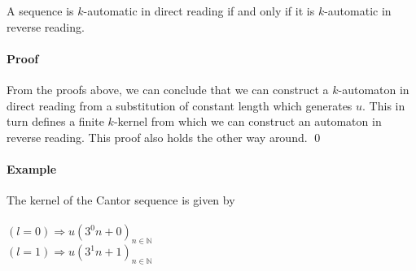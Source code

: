 \documentclass{article}
\begin{document}
\begin{automata}
A sequence is $k$-automatic in direct reading if and only if it is 
$k$-automatic in reverse reading.
\end{automata}

\paragraph{Proof} From the proofs above, we can conclude that we can construct 
a $k$-automaton in direct reading from a substitution of constant length which 
generates $u$.  This in turn defines a finite $k$-kernel from which we can 
construct an automaton in reverse reading. This proof also holds the other way 
around. \qed

\paragraph{Example} The kernel of the Cantor sequence is given by\\
\\
$(l = 0) \Rightarrow u(3^0 n + 0)_{n \in \mathbb{N}}$\\
$(l = 1) \Rightarrow u(3^1 n + 1)_{n \in \mathbb{N}}$\\
\end{document}
